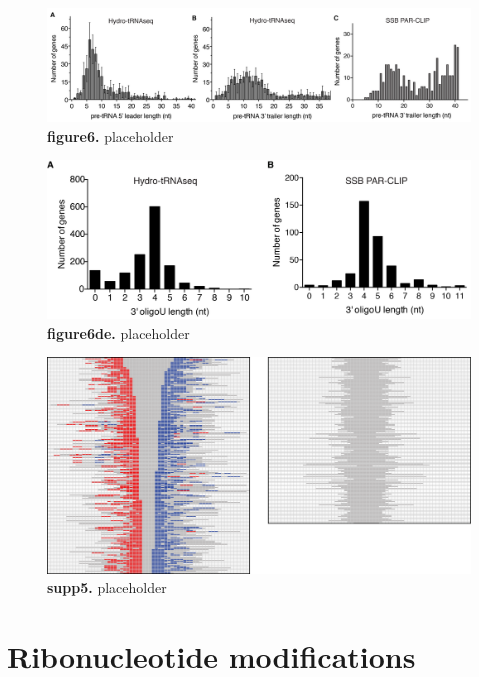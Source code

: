 \documentclass[12pt]{rockefeller}
\begin{document}
\begin{figure}[!ht]%
\centering
\includegraphics[width=\textwidth]{paper6.png}%
\caption[figure6]
{\textbf{figure6.}
placeholder}
\centering
\label{paper6}%
\end{figure}

\begin{figure}[!ht]%
\centering
\includegraphics[width=\textwidth]{paper6de.png}%
\caption[figure6de]
{\textbf{figure6de.}
placeholder}
\centering
\label{paper6de}%
\end{figure}

\begin{figure}[!ht]%
\centering
\includegraphics[width=\textwidth]{supp5.png}%
\caption[supp5]
{\textbf{supp5.}
placeholder}
\centering
\label{supp5}%
\end{figure}

\section{Ribonucleotide modifications}\label{modifications}
\end{document}

